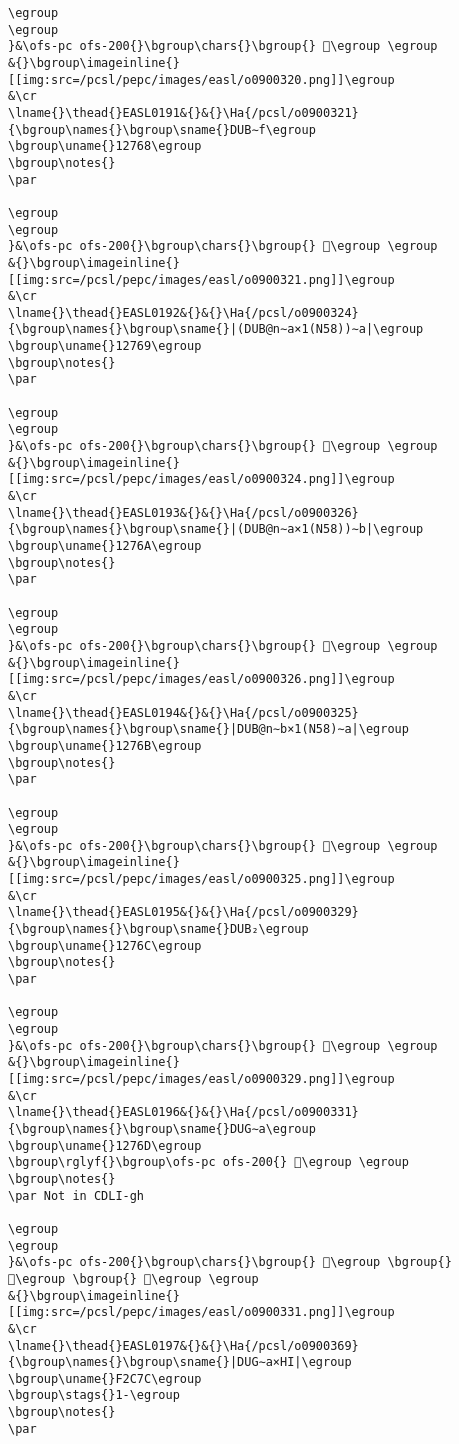 \begin{verbatim}
\egroup
\egroup
}&\ofs-pc ofs-200{}\bgroup\chars{}\bgroup{} 𒝧\egroup \egroup
&{}\bgroup\imageinline{}[[img:src=/pcsl/pepc/images/easl/o0900320.png]]\egroup
&\cr
\lname{}\thead{}EASL0191&{}&{}\Ha{/pcsl/o0900321}{\bgroup\names{}\bgroup\sname{}DUB∼f\egroup
\bgroup\uname{}12768\egroup
\bgroup\notes{}
\par 

\egroup
\egroup
}&\ofs-pc ofs-200{}\bgroup\chars{}\bgroup{} 𒝨\egroup \egroup
&{}\bgroup\imageinline{}[[img:src=/pcsl/pepc/images/easl/o0900321.png]]\egroup
&\cr
\lname{}\thead{}EASL0192&{}&{}\Ha{/pcsl/o0900324}{\bgroup\names{}\bgroup\sname{}|(DUB@n∼a×1(N58))∼a|\egroup
\bgroup\uname{}12769\egroup
\bgroup\notes{}
\par 

\egroup
\egroup
}&\ofs-pc ofs-200{}\bgroup\chars{}\bgroup{} 𒝩\egroup \egroup
&{}\bgroup\imageinline{}[[img:src=/pcsl/pepc/images/easl/o0900324.png]]\egroup
&\cr
\lname{}\thead{}EASL0193&{}&{}\Ha{/pcsl/o0900326}{\bgroup\names{}\bgroup\sname{}|(DUB@n∼a×1(N58))∼b|\egroup
\bgroup\uname{}1276A\egroup
\bgroup\notes{}
\par 

\egroup
\egroup
}&\ofs-pc ofs-200{}\bgroup\chars{}\bgroup{} 𒝪\egroup \egroup
&{}\bgroup\imageinline{}[[img:src=/pcsl/pepc/images/easl/o0900326.png]]\egroup
&\cr
\lname{}\thead{}EASL0194&{}&{}\Ha{/pcsl/o0900325}{\bgroup\names{}\bgroup\sname{}|DUB@n∼b×1(N58)∼a|\egroup
\bgroup\uname{}1276B\egroup
\bgroup\notes{}
\par 

\egroup
\egroup
}&\ofs-pc ofs-200{}\bgroup\chars{}\bgroup{} 𒝫\egroup \egroup
&{}\bgroup\imageinline{}[[img:src=/pcsl/pepc/images/easl/o0900325.png]]\egroup
&\cr
\lname{}\thead{}EASL0195&{}&{}\Ha{/pcsl/o0900329}{\bgroup\names{}\bgroup\sname{}DUB₂\egroup
\bgroup\uname{}1276C\egroup
\bgroup\notes{}
\par 

\egroup
\egroup
}&\ofs-pc ofs-200{}\bgroup\chars{}\bgroup{} 𒝬\egroup \egroup
&{}\bgroup\imageinline{}[[img:src=/pcsl/pepc/images/easl/o0900329.png]]\egroup
&\cr
\lname{}\thead{}EASL0196&{}&{}\Ha{/pcsl/o0900331}{\bgroup\names{}\bgroup\sname{}DUG∼a\egroup
\bgroup\uname{}1276D\egroup
\bgroup\rglyf{}\bgroup\ofs-pc ofs-200{} 𒝭\egroup \egroup
\bgroup\notes{}
\par Not in CDLI-gh

\egroup
\egroup
}&\ofs-pc ofs-200{}\bgroup\chars{}\bgroup{} 𒝶\egroup \bgroup{} 𒝵\egroup \bgroup{} 𒝭\egroup \egroup
&{}\bgroup\imageinline{}[[img:src=/pcsl/pepc/images/easl/o0900331.png]]\egroup
&\cr
\lname{}\thead{}EASL0197&{}&{}\Ha{/pcsl/o0900369}{\bgroup\names{}\bgroup\sname{}|DUG∼a×HI|\egroup
\bgroup\uname{}F2C7C\egroup
\bgroup\stags{}1-\egroup
\bgroup\notes{}
\par 


\end{verbatim}
